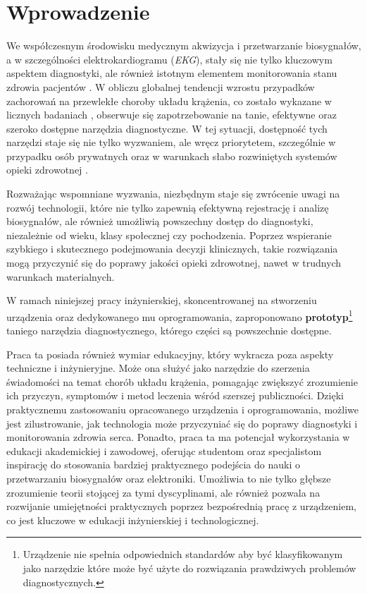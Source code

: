 
\chapter*{Wprowadzenie}

We współczesnym środowisku medycznym akwizycja i przetwarzanie biosygnałów,  
a w szczególności elektrokardiogramu (\textit{EKG}), stały się nie tylko kluczowym aspektem diagnostyki, 
ale również istotnym elementem monitorowania stanu zdrowia pacjentów \cite{Serhani2020}. 
W obliczu globalnej tendencji wzrostu przypadków zachorowań na przewlekłe choroby układu krążenia, co zostało
wykazane w licznych badaniach \cite{Gaidai2023}, 
obserwuje się zapotrzebowanie na tanie, efektywne oraz szeroko dostępne narzędzia diagnostyczne. 
W tej sytuacji, dostępność tych narzędzi staje się nie tylko wyzwaniem, ale wręcz priorytetem, 
szczególnie w przypadku osób prywatnych oraz w warunkach słabo rozwiniętych 
systemów opieki zdrowotnej \cite{Faruk2021}.

Rozważając wspomniane wyzwania, niezbędnym staje się zwrócenie uwagi na rozwój technologii, które nie tylko zapewnią
efektywną rejestrację i analizę biosygnałów, ale również umożliwią powszechny dostęp do diagnostyki, niezależnie od
wieku, klasy społecznej czy pochodzenia. Poprzez wspieranie szybkiego i skutecznego podejmowania 
decyzji klinicznych,
takie rozwiązania mogą przyczynić się do poprawy jakości opieki zdrowotnej, nawet w trudnych warunkach materialnych.

W ramach niniejszej pracy inżynierskiej, skoncentrowanej na stworzeniu urządzenia 
oraz dedykowanego mu oprogramowania, zaproponowano \textbf{prototyp}\footnote{Urządzenie nie spełnia 
odpowiednich standardów aby być klasyfikowanym jako narzędzie które może być użyte do rozwiązania prawdziwych 
problemów diagnostycznych.} taniego narzędzia diagnostycznego, którego części są powszechnie dostępne. 

Praca ta posiada również wymiar edukacyjny, który wykracza poza aspekty techniczne i inżynieryjne. 
Może ona służyć jako narzędzie do szerzenia świadomości na temat chorób układu krążenia, pomagając zwiększyć zrozumienie ich przyczyn,
symptomów i metod leczenia wśród szerszej publiczności. Dzięki praktycznemu zastosowaniu opracowanego urządzenia i oprogramowania, 
możliwe jest zilustrowanie, jak technologia może przyczyniać się do poprawy diagnostyki i monitorowania zdrowia serca. 
Ponadto, praca ta ma potencjał wykorzystania w edukacji akademickiej i zawodowej, oferując studentom oraz specjalistom inspirację 
do stosowania bardziej praktycznego podejścia do nauki o przetwarzaniu biosygnałów oraz elektroniki. 
Umożliwia to nie tylko głębsze zrozumienie teorii stojącej za tymi dyscyplinami, ale również pozwala na rozwijanie
umiejętności praktycznych poprzez bezpośrednią pracę z urządzeniem, co jest kluczowe w edukacji inżynierskiej i technologicznej.

